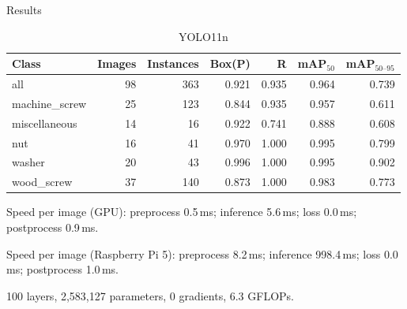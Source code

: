 \documentclass[aspectratio=169]{beamer}
\begin{document}
    \begin{frame}{Results}
        \begin{table}[!t]
            \centering
            \caption{Validation summaries.}
            \begin{subtable}{\linewidth}
              \centering
              \caption{YOLO11n}
              \begin{tabular}{lrrrrrr}
              \hline
              Class & Images & Instances & Box(P) & R & mAP$_{50}$ & mAP$_{50\mbox{--}95}$ \\
              \hline
              all            & 98 & 363 & 0.921 & 0.935 & 0.964 & 0.739 \\
              machine\_screw & 25 & 123 & 0.844 & 0.935 & 0.957 & 0.611 \\
              miscellaneous  & 14 &  16 & 0.922 & 0.741 & 0.888 & 0.608 \\
              nut            & 16 &  41 & 0.970 & 1.000 & 0.995 & 0.799 \\
              washer         & 20 &  43 & 0.996 & 1.000 & 0.995 & 0.902 \\
              wood\_screw    & 37 & 140 & 0.873 & 1.000 & 0.983 & 0.773 \\
              \hline
              \end{tabular}
              \par\smallskip
              \small Speed per image (GPU): preprocess 0.5\,ms; inference 5.6\,ms; loss 0.0\,ms; postprocess 0.9\,ms.
              \par\smallskip
              \small Speed per image (Raspberry Pi 5): preprocess 8.2\,ms; inference 998.4\,ms; loss 0.0\,ms; postprocess 1.0\,ms.
              \par\smallskip
              \small 100 layers, 2,583,127 parameters, 0 gradients, 6.3 GFLOPs.
            \end{subtable}
        \end{table}
    \end{frame}
\end{document}
